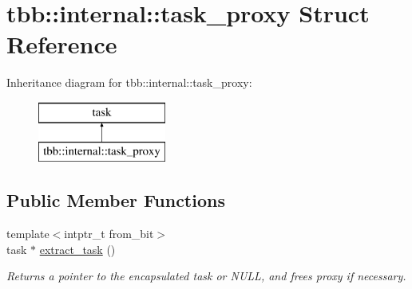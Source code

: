 \hypertarget{structtbb_1_1internal_1_1task__proxy}{}\section{tbb\+:\+:internal\+:\+:task\+\_\+proxy Struct Reference}
\label{structtbb_1_1internal_1_1task__proxy}
Inheritance diagram for tbb\+:\+:internal\+:\+:task\+\_\+proxy\+:\begin{figure}[H]
\begin{center}
\leavevmode
\includegraphics[height=2.000000cm]{structtbb_1_1internal_1_1task__proxy}
\end{center}
\end{figure}
\subsection*{Public Member Functions}
\begin{DoxyCompactItemize}
\item 
\hypertarget{structtbb_1_1internal_1_1task__proxy_a3a144ac1ce1252f4b4da060d5d3f5ded}{}{\footnotesize template$<$intptr\+\_\+t from\+\_\+bit$>$ }\\task $\ast$ \hyperlink{structtbb_1_1internal_1_1task__proxy_a3a144ac1ce1252f4b4da060d5d3f5ded}{extract\+\_\+task} ()\label{structtbb_1_1internal_1_1task__proxy_a3a144ac1ce1252f4b4da060d5d3f5ded}

\begin{DoxyCompactList}\small\item\em Returns a pointer to the encapsulated task or N\+U\+L\+L, and frees proxy if necessary. \end{DoxyCompactList}\end{DoxyCompactItemize}
